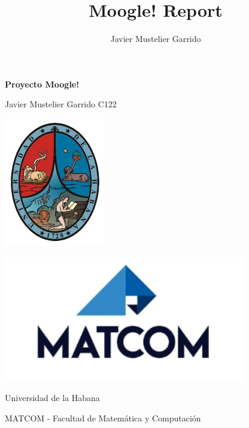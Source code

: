 \documentclass[10pt]{article}
\title{Moogle! Report}
\author{Javier Mustelier Garrido}
\begin{document}
\addtocounter{page}{-2} 

\begingroup %

\begin{center}
	\thispagestyle{empty}
	
	\fontsize{35}{0}
	\bfseries Proyecto Moogle!

	\vspace{1cm}
	
	\Large Javier Mustelier Garrido C122 

	\vspace{2cm}

	\includegraphics[width=125pt]{../assets/uh.jpeg}

	\vspace{2cm}

	\includegraphics[width=300pt]{../assets/matcom.png}

	\vspace{2cm}

	Universidad de la Habana 
	
	\large{ MATCOM - Facultad de Matemática y Computación }
	
\end{center}
\endgroup %

\begin{center} %
	\tableofcontents
	\thispagestyle{empty}
	\clearpage
\end{center} 
\end{document}
